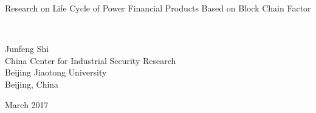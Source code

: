 \documentclass[11pt]{article}
\begin{document}
	\begin{center}\begin{LARGE}Research on Life Cycle of Power Financial Products Based on
	Block Chain Factor\end{LARGE}
	\\
	\vspace{0.4cm}
	\begin{large}
		Junfeng Shi\\
		China Center for Industrial Security Research\\
		Beijing Jiaotong University\\
		Beijing, China\\
	\end{large}
	\vspace{0.4cm}
	\begin{large}
		March 2017
	\end{large}
\end{center}
\end{document}
